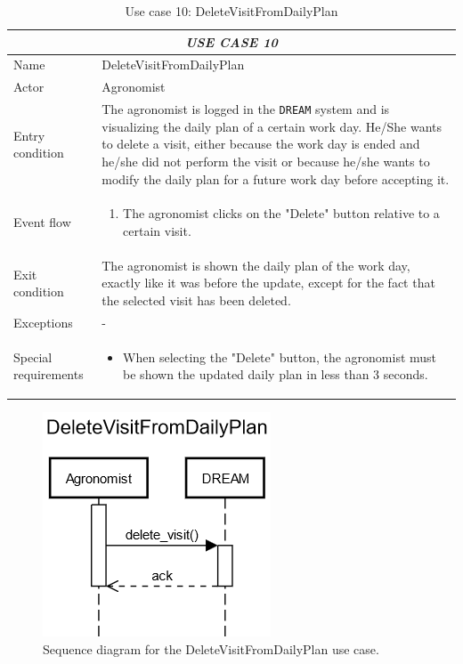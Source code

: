 \documentclass{article}
\begin{document}
\centering
\begin{longtable}{|p{3.5cm}|m{8cm}|}
\caption{Use case 10: DeleteVisitFromDailyPlan}
 \label{uc10}
 \hline
 \multicolumn{2}{|c|}{\cellcolor{white}\emph{USE CASE 10}} \\
 \endfirsthead
 \endhead
 \endfoot
 \endlastfoot
 \hline
 Name & DeleteVisitFromDailyPlan\\
 \hline
 Actor & Agronomist\\
 \hline
 Entry condition & The agronomist is logged in the \verb|DREAM| system and is visualizing the daily plan of a certain work day. He/She wants to delete a visit, either because the work day is ended and he/she did not perform the visit or because he/she wants to modify the daily plan for a future work day before accepting it.\\
 \hline
 Event flow & \begin{enumerate}
    \item The agronomist clicks on the "Delete" button relative to a certain visit.
 \end{enumerate}\\
 \hline
 Exit condition & The agronomist is shown the daily plan of the work day, exactly like it was before the update, except for the fact that the selected visit has been deleted.\\
 \hline
 Exceptions & - \\
 \hline
 Special requirements &\begin{itemize}
     \item When selecting the "Delete" button, the agronomist must be shown the updated daily plan in less than 3 seconds.
 \end{itemize}\\
 \hline
\end{longtable}

\begin{figure}[H]
    \centering
    \includegraphics[scale=0.75]{sequence_diagrams/DeleteVisitFromDailyPlan.png}
    \caption{Sequence diagram for the DeleteVisitFromDailyPlan use case.}
\end{figure}
\newpage
\end{document}
